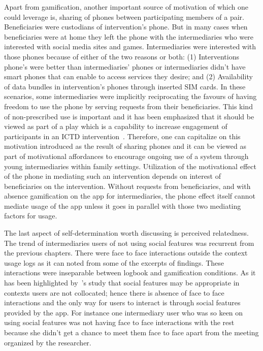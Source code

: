 Apart from gamification, another important source of motivation of which one could leverage is, sharing of phones between participating members of a pair. Beneficiaries were custodians of intervention's phone. But in many cases when beneficiaries were at home they left the phone with the intermediaries who were interested with social media sites and  games. Intermediaries were interested with those phones because of either of the two reasons or both: (1) Interventions phone's were better than intermediaries' phones or intermediaries didn't have smart phones that can enable to access services they desire; and (2) Availability of data bundles in intervention's phones through inserted SIM cards. In these scenarios, some intermediaries were implicitly reciprocating the favours of having freedom to use the phone by serving requests from their beneficiaries. This kind of non-prescribed use is important and it has been emphasized that it should be viewed as part of a play which is a capability to increase engagement of participants in an ICTD intervention~\citep{ferrplay2015}. Therefore, one can capitalize on this motivation introduced as the result of sharing phones and it can be viewed as part of motivational affordances to encourage ongoing use of a system through young intermediaries within family settings. Utilization of the motivational effect of the phone in mediating such an intervention depends on interest of beneficiaries on the intervention. Without requests from beneficiaries, and with absence gamification on the app for intermediaries, the phone effect itself cannot mediate usage of the app unless it goes in parallel with those two mediating factors for usage.

The last aspect of self-determination worth discussing is perceived relatedness. The trend of intermediaries users of not using social features was recurrent from the previous chapters. There were face to face interactions outside the context usage logs as it can noted from some of the excerpts of findings. These interactions were inseparable between logbook and gamification conditions. As it has been highlighted by~\cite{lin2006:fish}'s study that social features may be appropriate in contexts users are not collocated; hence there is absence of face to face interactions and the only way for users to interact is through social features provided by the app. For instance one intermediary user who was so keen on using social features was not having face to face interactions with the rest because she didn't get a chance to meet them face to face apart from the meeting organized by the researcher. 
